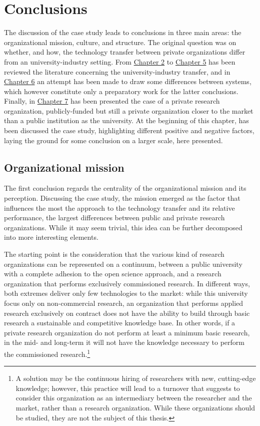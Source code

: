 \section{Conclusions}

The discussion of the case study leads to conclusions in three main areas: the organizational mission, culture, and structure. The original question was on whether, and how, the technology transfer between private organizations differ from an university-industry setting. From \hyperref[Chapter2]{Chapter 2} to \hyperref[Chapter5]{Chapter 5} has been reviewed the literature concerning the university-industry transfer, and in \hyperref[Chapter6]{Chapter 6} an attempt has been made to draw some differences between systems, which however constitute only a preparatory work for the latter conclusions. Finally, in \hyperref[Chapter7]{Chapter 7} has been presented the case of a private research organization, publicly-funded but still a private organization closer to the market than a public institution as the university. At the beginning of this chapter, has been discussed the case study, highlighting different positive and negative factors, laying the ground for some conclusion on a larger scale, here presented.

\subsection{Organizational mission}

The first conclusion regards the centrality of the organizational mission and its perception. Discussing the case study, the mission emerged as the factor that influences the most the approach to the technology transfer and its relative performance, the largest differences between public and private research organizations. While it may seem trivial, this idea can be further decomposed into more interesting elements.

The starting point is the consideration that the various kind of research organizations can be represented on a continuum, between a public university with a complete adhesion to the open science approach, and a research organization that performs exclusively commissioned research. In different ways, both extremes deliver only few technologies to the market: while this university focus only on non-commercial research, an organization that performs applied research exclusively on contract does not have the ability to build through basic research a sustainable and competitive knowledge base. In other words, if a private research organization do not perform at least a minimum basic research, in the mid- and long-term it will not have the knowledge necessary to perform the commissioned research.\footnote{A solution may be the continuous hiring of researchers with new, cutting-edge knowledge; however, this practice will lead to a turnover that suggests to consider this organization as an intermediary between the researcher and the market, rather than a research organization. While these organizations should be studied, they are not the subject of this thesis.}

